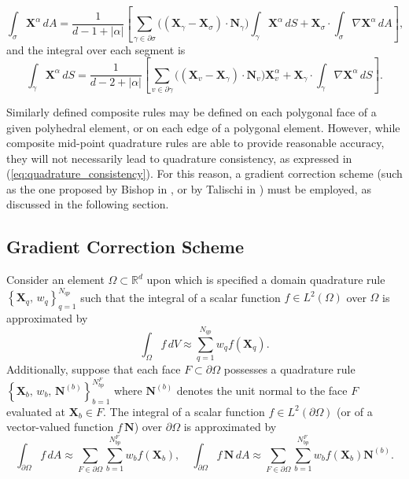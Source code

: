 	\begin{equation}
		\int_{\sigma} \mathbf{X}^\alpha \, dA = \frac{1}{d-1+|\alpha|} \left[ \sum_{\gamma \in \partial \sigma} \big( (\mathbf{X}_\gamma-\mathbf{X}_\sigma) \cdot \mathbf{N}_{\gamma} \big) \int_{\gamma} \mathbf{X}^\alpha \, dS + \mathbf{X}_\sigma \cdot \int_{\sigma} \nabla \mathbf{X}^\alpha \, dA \right],
	\end{equation}
	and the integral over each segment is
	\begin{equation}
		\int_{\gamma} \mathbf{X}^\alpha \, dS = \frac{1}{d-2+|\alpha|} \left[ \sum_{v \in \partial \gamma} \big( (\mathbf{X}_v-\mathbf{X}_\gamma) \cdot \mathbf{N}_{v} \big) \mathbf{X}^\alpha_v + \mathbf{X}_\gamma \cdot \int_{\gamma} \nabla \mathbf{X}^\alpha \, dS \right].
	\end{equation}
	
	Similarly defined composite rules may be defined on each polygonal face of a given polyhedral element, or on each edge of a polygonal element. However, while composite mid-point quadrature rules are able to provide reasonable accuracy, they will not necessarily lead to quadrature consistency, as expressed in (\ref{eq:quadrature_consistency}). For this reason, a gradient correction scheme (such as the one proposed by Bishop in \cite{Bishop:14}, or by Talischi in \cite{Talischi:15}) must be employed, as discussed in the following section.
	
	\subsection*{Gradient Correction Scheme}
	
	Consider an element $\Omega \subset \mathbb{R}^d$ upon which is specified a domain quadrature rule $\left\{ \mathbf{X}_q, \, w_q \right\}_{q=1}^{N_{qp}}$ such that the integral of a scalar function $f \in L^2 (\Omega)$ over $\Omega$ is approximated by
	\begin{equation}
		\int_\Omega f \, dV \approx \sum_{q=1}^{N_{qp}} w_q f(\mathbf{X}_q).
	\end{equation}
	Additionally, suppose that each face $F \subset \partial \Omega$ possesses a quadrature rule $\left\{ \mathbf{X}_b, \, w_b, \, \mathbf{N}^{(b)} \right\}_{b=1}^{N^{F}_{bp}}$ where $\mathbf{N}^{(b)}$ denotes the unit normal to the face $F$ evaluated at $\mathbf{X}_b \in F$. The integral of a scalar function $f \in L^2 (\partial \Omega)$ (or of a vector-valued function $f \, \mathbf{N}$) over $\partial \Omega$ is approximated by
	\begin{equation}
		\int_{\partial \Omega} f \, dA \approx \sum_{F \in \partial \Omega} \sum_{b=1}^{N^F_{bp}} w_b f(\mathbf{X}_b), \quad \int_{\partial \Omega} f \, \mathbf{N} \, dA \approx \sum_{F \in \partial \Omega} \sum_{b=1}^{N^F_{bp}} w_b f(\mathbf{X}_b) \mathbf{N}^{(b)}.
	\end{equation}
	
